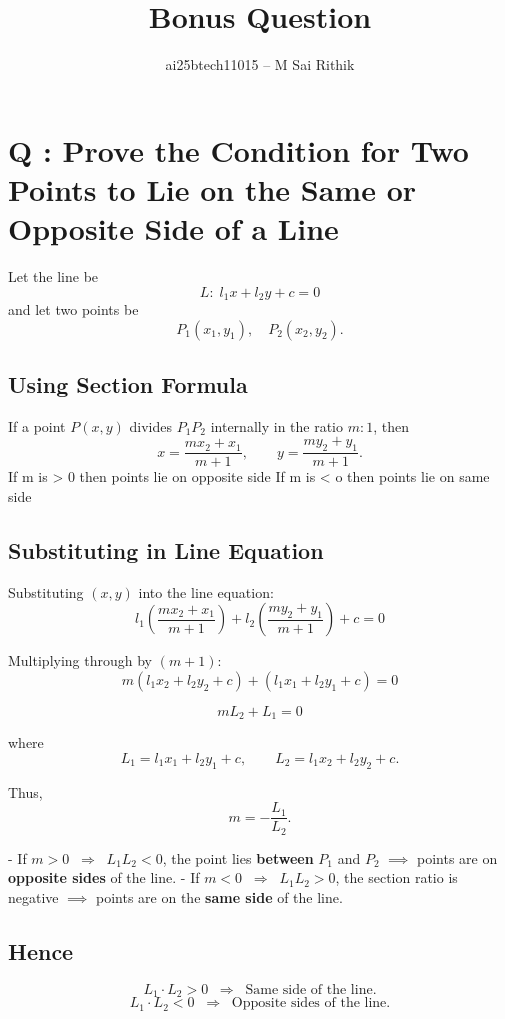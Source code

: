 \documentclass[12pt]{article}
\title{Bonus Question}
\author{ai25btech11015 -- M Sai Rithik}
\date{}
\begin{document}
\maketitle


\section*{Q : Prove the Condition for Two Points to Lie on the Same or Opposite Side of a Line}

Let the line be 
\[
L: \; l_1x + l_2y + c = 0
\]
and let two points be 
\[
P_1(x_1, y_1), \quad P_2(x_2, y_2).
\]



\subsection*{Using Section Formula}
If a point $P(x,y)$ divides $P_1P_2$ internally in the ratio $m:1$, then
\[
x = \frac{mx_2 + x_1}{m+1}, \qquad 
y = \frac{my_2 + y_1}{m+1}.
\]
If m is > 0 then points lie on opposite side 
If m is < o then points lie on same side 



\subsection*{Substituting in Line Equation}
Substituting $(x,y)$ into the line equation:
\[
l_1 \left( \frac{mx_2 + x_1}{m+1} \right) 
+ l_2 \left( \frac{my_2 + y_1}{m+1} \right) + c = 0
\]

Multiplying through by $(m+1)$:
\[
m(l_1x_2 + l_2y_2 + c) + (l_1x_1 + l_2y_1 + c) = 0
\]

\[
mL_2 + L_1 = 0
\]

where
\[
L_1 = l_1x_1 + l_2y_1 + c, \qquad
L_2 = l_1x_2 + l_2y_2 + c.
\]

Thus,
\[
m = -\frac{L_1}{L_2}.
\]



- If $m > 0 \;\;\Rightarrow\;\; L_1L_2 < 0$, the point lies \textbf{between} $P_1$ and $P_2$ $\implies$ points are on \textbf{opposite sides} of the line.  
- If $m < 0 \;\;\Rightarrow\;\; L_1L_2 > 0$, the section ratio is negative $\implies$ points are on the \textbf{same side} of the line.


\subsection*{Hence}
\[
L_1 \cdot L_2 > 0 \;\; \Rightarrow \;\; \text{Same side of the line.}
\]
\[
L_1 \cdot L_2 < 0 \;\; \Rightarrow \;\; \text{Opposite sides of the line.}
\]
\end{document}
